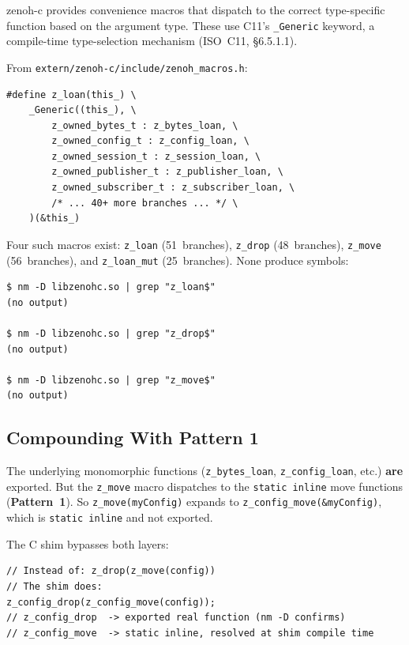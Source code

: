 \documentclass[11pt,a4paper]{article}
\newcommand{\code}[1]{\texttt{#1}}
\newcommand{\file}[1]{\texttt{#1}}
\newcommand{\fn}[1]{\texttt{#1}}
\newcommand{\pattern}[1]{\textbf{Pattern~#1}}
\begin{document}
zenoh-c provides convenience macros that dispatch to the correct type-specific
function based on the argument type. These use C11's \code{\_Generic} keyword,
a compile-time type-selection mechanism (ISO~C11, \S6.5.1.1).

From \file{extern/zenoh-c/include/zenoh\_macros.h}:

\begin{lstlisting}[style=cstyle,caption={\code{z\_loan} macro (lines 65--119, 51 branches)}]
#define z_loan(this_) \
    _Generic((this_), \
        z_owned_bytes_t : z_bytes_loan, \
        z_owned_config_t : z_config_loan, \
        z_owned_session_t : z_session_loan, \
        z_owned_publisher_t : z_publisher_loan, \
        z_owned_subscriber_t : z_subscriber_loan, \
        /* ... 40+ more branches ... */ \
    )(&this_)
\end{lstlisting}

Four such macros exist: \code{z\_loan} (51~branches), \code{z\_drop}
(48~branches), \code{z\_move} (56~branches), and \code{z\_loan\_mut}
(25~branches). None produce symbols:

\begin{lstlisting}[style=shellstyle]
$ nm -D libzenohc.so | grep "z_loan$"
(no output)

$ nm -D libzenohc.so | grep "z_drop$"
(no output)

$ nm -D libzenohc.so | grep "z_move$"
(no output)
\end{lstlisting}


\subsection{Compounding With Pattern 1}

The underlying monomorphic functions (\fn{z\_bytes\_loan},
\fn{z\_config\_loan}, etc.) \textbf{are} exported. But the \code{z\_move}
macro dispatches to the \code{static inline} move functions (\pattern{1}).
So \code{z\_move(myConfig)} expands to \code{z\_config\_move(\&myConfig)},
which is \code{static inline} and not exported.

The C shim bypasses both layers:

\begin{lstlisting}[style=cstyle]
// Instead of: z_drop(z_move(config))
// The shim does:
z_config_drop(z_config_move(config));
// z_config_drop  -> exported real function (nm -D confirms)
// z_config_move  -> static inline, resolved at shim compile time
\end{lstlisting}
\end{document}
